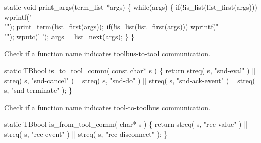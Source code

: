 \nwenddocs{}\endmoddef\let\nwnotused=\nwoutput{}\nwstartdeflinemarkup{}\nwenddeflinemarkup
static void print_args(term_list *args)
\{
  while(args) \{
    if(!is_list(list_first(args)))
      wprintf("\\"");
    print_term(list_first(args));
    if(!is_list(list_first(args)))
      wprintf("\\"");
    wputc(' ');
    args = list_next(args);
  \}
\}
\nwendcode{}\nwdocspar


Check if a function name indicates toolbus-to-tool communication.

\nwenddocs{}\endmoddef\let\nwnotused=\nwoutput{}\nwstartdeflinemarkup{}\nwenddeflinemarkup
static TBbool is_to_tool_comm( const char* s )
\{
   return streq( s, "snd-eval" )      || 
          streq( s, "snd-cancel" )    ||
          streq( s, "snd-do" )        || 
          streq( s, "snd-ack-event" ) ||
          streq( s, "snd-terminate" );
\}
\nwendcode{}\nwdocspar


Check if a function name indicates tool-to-toolbus communication.

\nwenddocs{}\endmoddef\let\nwnotused=\nwoutput{}\nwstartdeflinemarkup{}\nwenddeflinemarkup
static TBbool is_from_tool_comm( char* s )
\{
   return streq( s, "rec-value" ) ||  
          streq( s, "rec-event" ) ||
          streq( s, "rec-disconnect" );
\}
\nwendcode{}\nwdocspar


